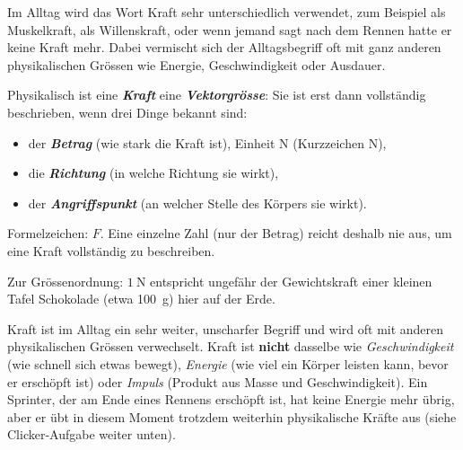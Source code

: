 \documentclass[addpoints,11pt,a4paper]{exam}
\begin{document}
\begin{theoriebox}
Im Alltag wird das Wort \glqq Kraft\grqq{} sehr unterschiedlich verwendet,
zum Beispiel als Muskelkraft, als \glqq Willenskraft\grqq{}, oder wenn
jemand sagt \glqq nach dem Rennen hatte er keine Kraft mehr\grqq{}. Dabei
vermischt sich der Alltagsbegriff oft mit ganz anderen physikalischen
Grössen wie Energie, Geschwindigkeit oder Ausdauer.

Physikalisch ist eine \textbf{\emph{Kraft}} eine \textbf{\emph{Vektorgrösse}}:
Sie ist erst dann vollständig beschrieben, wenn drei Dinge bekannt sind:
\begin{itemize}[leftmargin=1.2cm,itemsep=0.25em]
  \item der \textbf{\emph{Betrag}} (wie stark die Kraft ist), Einheit
  $\si{\newton}$ (Kurzzeichen $\text{N}$),
  \item die \textbf{\emph{Richtung}} (in welche Richtung sie wirkt),
  \item der \textbf{\emph{Angriffspunkt}} (an welcher Stelle des Körpers sie
  wirkt).
\end{itemize}
Formelzeichen: $F$. Eine einzelne Zahl (nur der Betrag) reicht deshalb nie
aus, um eine Kraft vollständig zu beschreiben.

Zur Grössenordnung: $\SI{1}{\newton}$ entspricht ungefähr der
Gewichtskraft einer kleinen Tafel Schokolade (etwa \SI{100}{\gram}) hier auf
der Erde.
\end{theoriebox}

\begin{hinweisbox}
\glqq Kraft\grqq{} ist im Alltag ein sehr weiter, unscharfer Begriff und wird
oft mit anderen physikalischen Grössen verwechselt. Kraft ist
\textbf{nicht} dasselbe wie \emph{Geschwindigkeit} (wie schnell sich etwas
bewegt), \emph{Energie} (wie viel ein Körper \glqq leisten\grqq{} kann,
bevor er \glqq erschöpft\grqq{} ist) oder \emph{Impuls} (Produkt aus Masse
und Geschwindigkeit). Ein Sprinter, der am Ende eines Rennens erschöpft
ist, hat keine \glqq Energie mehr übrig\grqq{}, aber er übt in diesem
Moment trotzdem weiterhin physikalische Kräfte aus (siehe Clicker-Aufgabe
weiter unten).
\end{hinweisbox}
\end{document}
